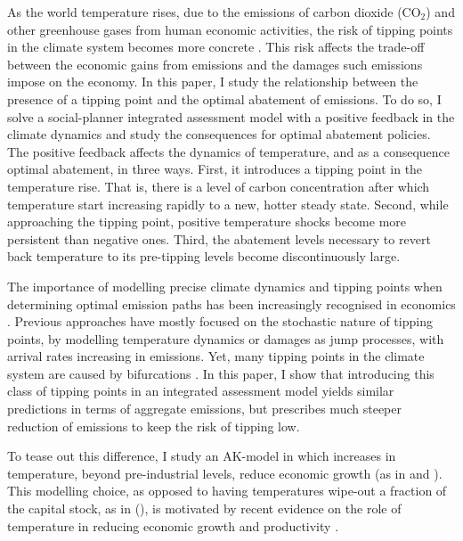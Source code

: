 \documentclass[../../main.tex]{subfiles}
\begin{document}
As the world temperature rises, due to the emissions of carbon dioxide (CO$_2$) and other greenhouse gases from human economic activities, the risk of tipping points in the climate system becomes more concrete \citep{ashwin_extreme_2020,sledd_cloudier_2021}. This risk affects the trade-off between the economic gains from emissions and the damages such emissions impose on the economy. In this paper, I study the relationship between the presence of a tipping point and the optimal abatement of emissions. To do so, I solve a social-planner integrated assessment model with a positive feedback in the climate dynamics \citep[pp. 81-116]{mcguffie_climate_2005} and study the consequences for optimal abatement policies. The positive feedback affects the dynamics of temperature, and as a consequence optimal abatement, in three ways. First, it introduces a tipping point in the temperature rise. That is, there is a level of carbon concentration after which temperature start increasing rapidly to a new, hotter steady state. Second, while approaching the tipping point, positive temperature shocks become more persistent than negative ones. Third, the abatement levels necessary to revert back temperature to its pre-tipping levels become discontinuously large. 

The importance of modelling precise climate dynamics and tipping points when determining optimal emission paths has been increasingly recognised in economics \citep{van_den_bremer_risk-adjusted_2021,dietz_economic_2021,dietz_are_2020,taconet_social_2021,lontzek_stochastic_2015}. Previous approaches have mostly focused on the stochastic nature of tipping points, by modelling temperature dynamics \citep{dietz_economic_2021} or damages \citep{lontzek_stochastic_2015} as jump processes, with arrival rates increasing in emissions. Yet, many tipping points in the climate system are caused by bifurcations \citep{ashwin_extreme_2020,ashwin_tipping_2012}. In this paper, I show that introducing this class of tipping points in an integrated assessment model yields similar predictions in terms of aggregate emissions, but prescribes much steeper reduction of emissions to keep the risk of tipping low.

To tease out this difference, I study an AK-model in which increases in temperature, beyond pre-industrial levels, reduce economic growth (as in \cite{pindyck_economic_2013} and \cite{hambel_optimal_2021}). This modelling choice, as opposed to having temperatures wipe-out a fraction of the capital stock, as in \citeauthor{nordhaus_estimates_2014} (\citeyear{nordhaus_estimates_2014,nordhaus_revisiting_2017}), is motivated by recent evidence on the role of temperature in reducing economic growth and productivity \citep{burke_global_2015, dietz_growth_2019}.
\end{document}
